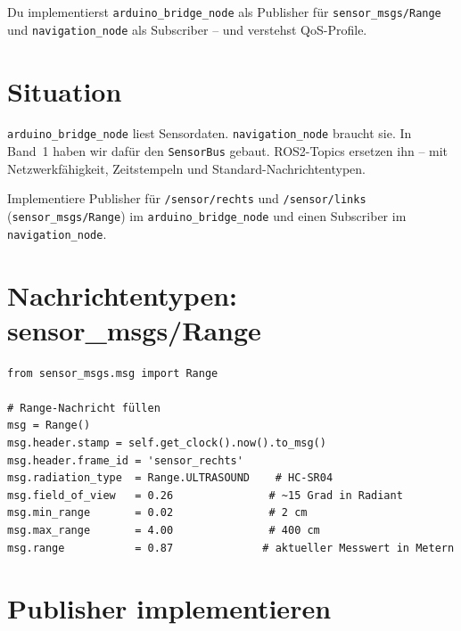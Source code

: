 \begin{lernziele}
Du implementierst \texttt{arduino\_bridge\_node} als Publisher
für \texttt{sensor\_msgs/Range} und \texttt{navigation\_node}
als Subscriber -- und verstehst QoS-Profile.
\end{lernziele}

\section{Situation}

\texttt{arduino\_bridge\_node} liest Sensordaten.
\texttt{navigation\_node} braucht sie.
In Band~1 haben wir dafür den \texttt{SensorBus} gebaut.
ROS2-Topics ersetzen ihn -- mit Netzwerkfähigkeit, Zeitstempeln
und Standard-Nachrichtentypen.

\begin{aufgabeBox}
Implementiere Publisher für \texttt{/sensor/rechts} und \texttt{/sensor/links}
(\texttt{sensor\_msgs/Range}) im \texttt{arduino\_bridge\_node}
und einen Subscriber im \texttt{navigation\_node}.
\end{aufgabeBox}

\section{Nachrichtentypen: sensor\_msgs/Range}

\begin{lstlisting}
from sensor_msgs.msg import Range

# Range-Nachricht füllen
msg = Range()
msg.header.stamp = self.get_clock().now().to_msg()
msg.header.frame_id = 'sensor_rechts'
msg.radiation_type  = Range.ULTRASOUND    # HC-SR04
msg.field_of_view   = 0.26               # ~15 Grad in Radiant
msg.min_range       = 0.02               # 2 cm
msg.max_range       = 4.00               # 400 cm
msg.range           = 0.87              # aktueller Messwert in Metern
\end{lstlisting}

\section{Publisher implementieren}

